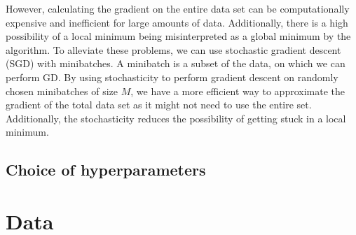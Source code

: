 \documentclass[a4paper, 11pt, twocolumn]{article}
\begin{document}
However, calculating the gradient on the entire data set can be computationally
expensive and inefficient for large amounts of data. Additionally, there is a high
possibility of a local minimum being misinterpreted as a global minimum by the
algorithm. To alleviate these problems, we can use stochastic gradient descent
(SGD) with minibatches.  A minibatch is a subset of the data, on which we can
perform GD. By using stochasticity to perform gradient descent on randomly chosen
minibatches of size $M$, we have a more efficient way to approximate the gradient
of the total data set as it might not need to use the entire set. Additionally,
the stochasticity reduces the possibility of getting stuck in a local minimum.

\subsection{Choice of hyperparameters}


\section{Data}
\end{document}

